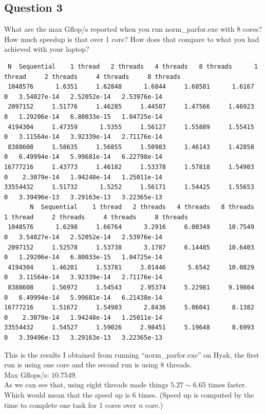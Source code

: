 \documentclass[]{article}
\begin{document}
    \subsection*{Question 3}
        What are the max Gflop/s reported when you run norm\_parfor.exe with 8 cores? How much speedup is that over 1 core? How does that compare to what you had achieved with your laptop?
        \begin{lstlisting}
 N  Sequential    1 thread   2 threads   4 threads   8 threads      1 thread     2 threads     4 threads     8 threads
 1048576      1.6351     1.62848      1.6844     1.68581      1.6167             0   3.54027e-14   2.52052e-14   2.53976e-14
 2097152     1.51776     1.46285     1.44507     1.47566     1.46923             0   1.29206e-14   6.80033e-15   1.04725e-14
 4194304     1.47359      1.5355     1.56127     1.55889     1.55415             0   3.11564e-14   3.92339e-14   2.71176e-14
 8388608     1.58635     1.56855     1.50983     1.46143     1.42858             0   6.49994e-14   5.99681e-14   6.22798e-14
16777216     1.43773     1.46182     1.53378     1.57818     1.54903             0    2.3079e-14   1.94248e-14   1.25011e-14
33554432     1.51732      1.5252     1.56171     1.54425     1.55653             0   3.39496e-13   3.29163e-13   3.22365e-13
       N  Sequential    1 thread   2 threads   4 threads   8 threads      1 thread     2 threads     4 threads     8 threads
 1048576      1.6298     1.66764      3.2916     6.00349     10.7549             0   3.54027e-14   2.52052e-14   2.53976e-14
 2097152     1.52578     1.53738      3.1787     6.14485     10.6403             0   1.29206e-14   6.80033e-15   1.04725e-14
 4194304     1.46201     1.53781     3.01446      5.6542     10.0829             0   3.11564e-14   3.92339e-14   2.71176e-14
 8388608     1.56972     1.54543     2.95374     5.22981     9.19804             0   6.49994e-14   5.99681e-14   6.21438e-14
16777216     1.51672     1.54903      2.8436     5.06041      8.1382             0    2.3079e-14   1.94248e-14   1.25011e-14
33554432     1.54527     1.59026     2.98451     5.19648      8.6993             0   3.39496e-13   3.29163e-13   3.22365e-13       
        \end{lstlisting}
        This is the results I obtained from running ``norm\_parfor.exe'' on Hyak, the first run is using one core and the second run is using 8 threads. 
        \\
        Max Gflops/s: $10.7549$. 
        \\
        As we can see that, using eight threads made things $5.27\sim 6.65$ times faster. Which would mean that the speed up is 6 times. (Speed up is computed by the time to complete one task for $1$ cores over $n$ core.)
\end{document}
